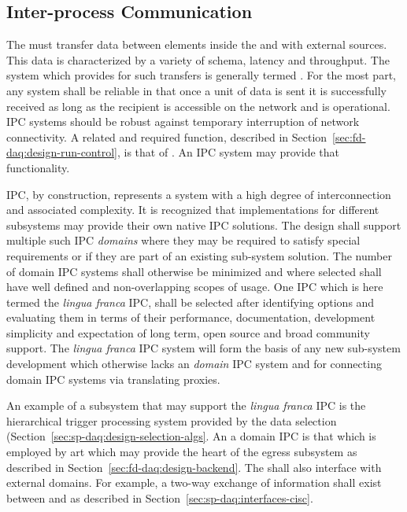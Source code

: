 \subsection{Inter-process Communication}
\label{sec:fd-daq:design-messages}

The  must transfer data between elements inside the  and with external sources. 
This data is characterized by a variety of schema, latency and throughput. 
The system which provides for such transfers is generally termed .
For the most part, any  system shall be reliable in that once a unit of data is sent it is successfully received as long as the recipient is accessible on the network and is operational. 
IPC systems should be robust against temporary interruption of network connectivity. 
A related and required function, described in Section~\ref{sec:fd-daq:design-run-control}, is that of . 
An IPC system may provide that functionality.

IPC, by construction, represents a system with a high degree of interconnection and associated complexity. 
It is recognized that implementations for different  subsystems may provide their own native IPC solutions. 
The  design shall support multiple such IPC \textit{domains} where they may be required to satisfy special requirements or if they are part of an existing sub-system solution. 
The number of domain IPC systems shall otherwise be minimized and where selected shall have well defined and non-overlapping scopes of usage. 
One IPC which is here termed the \textit{lingua franca} IPC, shall be selected after identifying options and evaluating them in terms of their performance, documentation, development simplicity and expectation of long term, open source and broad community support. 
The \textit{lingua franca} IPC system will form the basis of any new sub-system development which otherwise lacks an \textit{domain} IPC system and for connecting domain IPC systems via translating proxies.

An example of a subsystem that may support the \textit{lingua franca} IPC is the hierarchical trigger processing system provided by the data selection (Section~\ref{sec:sp-daq:design-selection-algs}. 
An a domain IPC is that which is employed by art which may provide the heart of the egress subsystem as described in Section~\ref{sec:fd-daq:design-backend}.
The  shall also interface with external domains. 
For example, a two-way exchange of information shall exist between  and  as described in Section~\ref{sec:sp-daq:interfaces-cisc}.  

